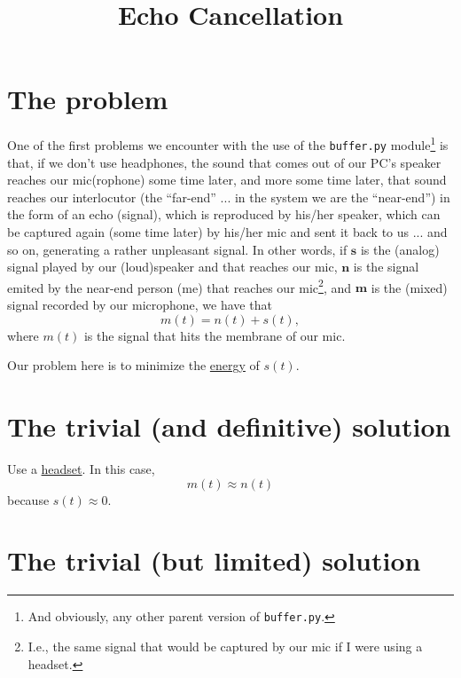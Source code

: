 
\title{Echo Cancellation}

\maketitle

\section{The problem}

One of the first problems we encounter with the use of the
\texttt{buffer.py} module\footnote{And obviously, any other parent
  version of \texttt{buffer.py}.} is that, if we don't use headphones,
the sound that comes out of our PC's speaker reaches our mic(rophone)
some time later, and more some time later, that sound reaches our
interlocutor (the ``far-end'' ... in the system we are the
``near-end'') in the form of an echo (signal), which is reproduced by
his/her speaker, which can be captured again (some time later) by his/her
mic and sent it back to us ... and so on, generating a rather
unpleasant signal. In other words, if ${\mathbf s}$ is the (analog)
signal played by our (loud)speaker and that reaches our mic,
${\mathbf n}$ is the signal emited by the near-end person (me) that
reaches our mic\footnote{I.e., the same signal that would be captured
  by our mic if I were using a headset.}, and ${\mathbf m}$ is the
(mixed) signal recorded by our microphone, we have that
\begin{equation}
  m(t) = n(t) + s(t),
  \label{eq:echo_problem}
\end{equation}
where $m(t)$ is the signal that hits the membrane of our mic.

Our problem here is to minimize the
\href{https://en.wikipedia.org/wiki/Energy_(signal_processing)}{energy}
of $s(t)$.

\section{The trivial (and definitive) solution}

Use a \href{https://en.wikipedia.org/wiki/Audio_headset}{headset}. In
this case,
\begin{equation}
  m(t) \approx n(t)
  \label{eq:headset_solution}
\end{equation}
because $s(t)\approx 0$.

\section{The trivial (but limited) solution}

